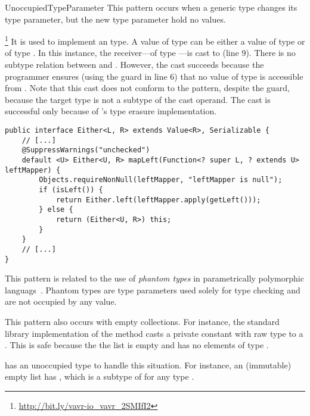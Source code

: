 \begin{pattern}{UnoccupiedTypeParameter}
This pattern occurs when a generic type changes its type parameter,
but the new type parameter hold no values.

\instances{}
\footnote{\url{http://bit.ly/vavr-io_vavr_2SMIfI2}}
It is used to implement an  type.
A value of type  can be either a value of type  or of type .
In this instance,
the receiver---of type ---is cast to  (line 9).
There is no subtype relation between  and .
However, the cast succeeds because the programmer ensures
(using the guard  in line 6)
that no value of type  is accessible from .
Note that this cast does not conform to the 
pattern, despite the guard, because the target type is not a subtype of the
cast operand. The cast is successful only because of \java{}'s type erasure
implementation.

\begin{verbatim}
public interface Either<L, R> extends Value<R>, Serializable {
    // [...]
    @SuppressWarnings("unchecked")
    default <U> Either<U, R> mapLeft(Function<? super L, ? extends U> leftMapper) {
        Objects.requireNonNull(leftMapper, "leftMapper is null");
        if (isLeft()) {
            return Either.left(leftMapper.apply(getLeft()));
        } else {
            return (Either<U, R>) this;
        }
    }
    // [...]
}
\end{verbatim}

\discussion{}
  This pattern is related to the use of \emph{phantom types} in parametrically
  polymorphic languags~\cite{LeijenMeijer99,cheneyHinzePhantomTypes}. Phantom types are type parameters used solely for
  type checking and are not occupied by any value.

  This pattern also occurs with empty collections. For instance, the \java{}
  standard library implementation of the method 
  casts a private constant with raw type  to a .
  This is safe because the the list is empty and has no elements of type
  .

  \scala{} has an unoccupied  type to handle this situation.
  For instance, an (immutable) empty list has , which
  is a subtype of  for any type .


\end{pattern}
